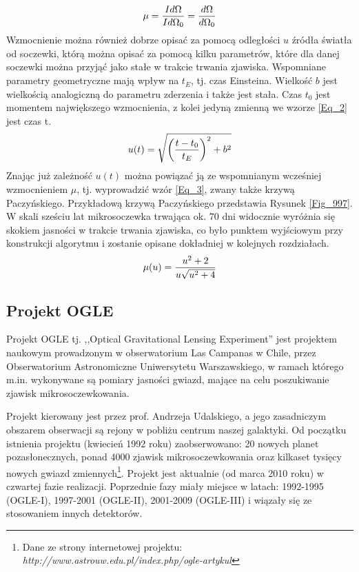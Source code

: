 \documentclass[a4paper,11pt]{article}
\newcommand{\ak}{\hspace{0.7 cm}}
\begin{document}
\begin{equation}
\centering
\mu=\frac{Id\Omega}{Id\Omega_{0}}=\frac{d\Omega}{d\Omega_{0}}
\label{Eq_1}
\end{equation}
\flushleft
\ak Wzmocnienie można również dobrze opisać za pomocą odległości $u$ źródła światła od soczewki, którą można opisać za pomocą kilku parametrów, które dla danej soczewki można przyjąć jako stałe w trakcie trwania zjawiska. Wspomniane parametry geometryczne mają wpływ na $t_{E}$, tj. czas Einsteina. Wielkość $b$ jest wielkością analogiczną do parametru zderzenia i także jest stała. Czas $t_{0}$ jest momentem największego wzmocnienia, z kolei jedyną zmienną we wzorze \ref{Eq_2} jest czas {t}.
\begin{equation}
\centering
u(t)=\sqrt{\left(\frac{t-t_{0}}{t_{E}}\right)^{2}+b^{2}}
\label{Eq_2}
\end{equation}
\ak Znając już zależność $u(t)$ można powiązać ją ze wspomnianym wcześniej wzmocnieniem $\mu$, tj. wyprowadzić wzór \ref{Eq_3}, zwany także krzywą Paczyńskiego. Przykładową krzywą Paczyńskiego przedstawia Rysunek \ref{Fig_997}. %
W skali sześciu lat mikrosoczewka trwająca ok. $70$ dni widocznie wyróżnia się skokiem jasności w trakcie trwania zjawiska, co było punktem wyjściowym przy konstrukcji algorytmu i zostanie opisane dokładniej w kolejnych rozdziałach.
\begin{equation}
\centering
\mu(u)=\frac{u^{2}+2}{u\sqrt{u^{2}+4}}
\label{Eq_3}
\end{equation}
\flushleft
\subsection{Projekt OGLE}

\ak Projekt OGLE  tj. ,,Optical Gravitational Lensing Experiment'' jest projektem naukowym prowadzonym w obserwatorium Las Campanas w Chile, przez Obserwatorium Astronomiczne Uniwersytetu Warszawskiego, w ramach którego m.in. wykonywane są pomiary jasności gwiazd, mające na celu poszukiwanie zjawisk mikrosoczewkowania. 

\ak Projekt kierowany jest przez prof. Andrzeja Udalskiego, a jego zasadniczym obszarem obserwacji są rejony w pobliżu centrum naszej galaktyki. Od początku istnienia projektu (kwiecień 1992 roku) zaobserwowano: 20 nowych planet pozasłonecznych, ponad 4000 zjawisk mikrosoczewkowania oraz kilkaset tysięcy nowych gwiazd zmiennych\footnote{Dane ze strony internetowej projektu: \textit{http://www.astrouw.edu.pl/index.php/ogle-artykul}}. Projekt jest aktualnie (od marca 2010 roku) w czwartej fazie realizacji. Poprzednie fazy miały miejsce w latach: 1992-1995 (OGLE-I), 1997-2001 (OGLE-II), 2001-2009 (OGLE-III) i wiązały się ze stosowaniem innych detektorów.
 
\end{document}
